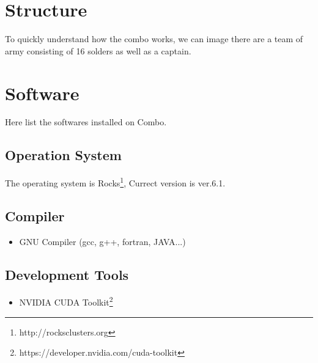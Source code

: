 
\section{Structure}

To quickly understand how the combo works, we can image there are a team of army consisting of 16 solders as well as a captain. 


\section{Software}

Here list the softwares installed on Combo.

\subsection{Operation System}

The operating system is Rocks\footnote{http://rocksclusters.org}, Currect version is ver.6.1.

\subsection{Compiler}

\begin{itemize}
\item GNU Compiler (gcc, g++, fortran, JAVA...)
\end{itemize}

\subsection{Development Tools}

\begin{itemize}
\item NVIDIA CUDA Toolkit\footnote{https://developer.nvidia.com/cuda-toolkit}
\end{itemize}